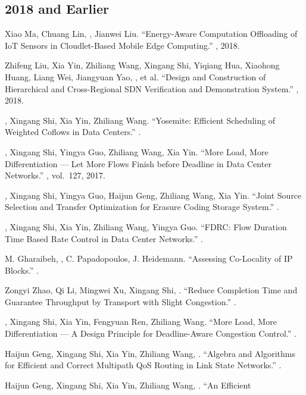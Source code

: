 \documentclass[11pt]{article}
\begin{document}
\subsection*{2018 and Earlier}
\begin{publist}
\item Xiao Ma, Chuang Lin, \corr, Jianwei Liu. ``Energy-Aware
Computation Offloading of IoT Sensors in Cloudlet-Based Mobile Edge Computing.''
, 2018.
\item Zhifeng Liu, Xia Yin, Zhiliang Wang, Xingang Shi, Yiqiang Hua, Xiaohong Huang,
Liang Wei, Jiangyuan Yao, , et al. ``Design and Construction of
Hierarchical and Cross-Regional SDN Verification and Demonstration System.''
, 2018.
\item {}, Xingang Shi\corr, Xia Yin, Zhiliang Wang. ``Yosemite: Efficient
Scheduling of Weighted Coflows in Data Centers.'' .
\item {}, Xingang Shi\corr, Yingya Guo, Zhiliang Wang, Xia Yin. ``More
Load, More Differentiation --- Let More Flows Finish before Deadline in Data Center
Networks.'' , vol.~127, 2017.
\item {}, Xingang Shi, Yingya Guo, Haijun Geng, Zhiliang Wang, Xia Yin.
``Joint Source Selection and Transfer Optimization for Erasure Coding Storage
System.'' .
\item {}, Xingang Shi, Xia Yin, Zhiliang Wang, Yingya Guo. ``FDRC: Flow
Duration Time Based Rate Control in Data Center Networks.'' .
\item M. Gharaibeh, , C. Papadopoulos, J. Heidemann. ``Assessing
Co-Locality of IP Blocks.'' .
\item Zongyi Zhao, Qi Li, Mingwei Xu, Xingang Shi, . ``Reduce Completion
Time and Guarantee Throughput by Transport with Slight Congestion.''
.
\item {}, Xingang Shi, Xia Yin, Fengyuan Ren, Zhiliang Wang. ``More Load,
More Differentiation --- A Design Principle for Deadline-Aware Congestion Control.''
.
\item Haijun Geng, Xingang Shi, Xia Yin, Zhiliang Wang, . ``Algebra and
Algorithms for Efficient and Correct Multipath QoS Routing in Link State Networks.''
.
\item Haijun Geng, Xingang Shi, Xia Yin, Zhiliang Wang, . ``An Efficient

\end{publist}
\end{document}
